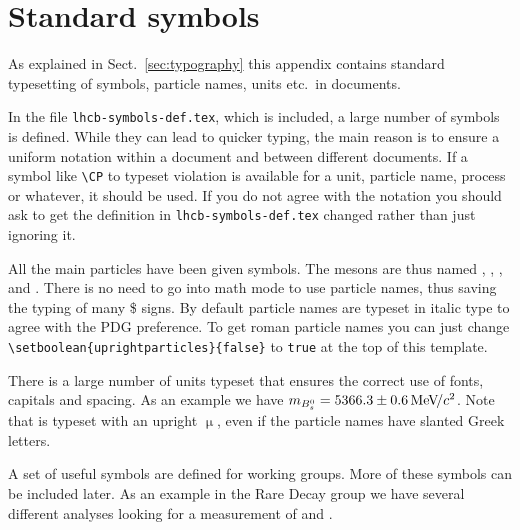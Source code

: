 \section{Standard symbols}

As explained in Sect.~\ref{sec:typography} this appendix contains standard
typesetting of symbols, particle names, units etc.\ in \lhcb
documents.

In the file \texttt{lhcb-symbols-def.tex}, which is included, a
large number of symbols is defined. While they can lead to quicker
typing, the main reason is to ensure a uniform notation within a
document and between different \lhcb documents. If a symbol
like \texttt{\textbackslash CP} to typeset \CP violation is available
for a unit, particle name, process or whatever, it should be used.  If
you do not agree with the notation you should ask to get the
definition in \texttt{lhcb-symbols-def.tex} changed rather than just
ignoring it.

All the main particles have been given symbols. The \B mesons are thus
named \Bp, \Bd, \Bs, and \Bc. There is no need to go into math mode to
use particle names, thus saving the typing of many \$ signs. By
default particle names are typeset in italic type to agree with the
PDG preference. To get roman particle
names you can just change
\texttt{\textbackslash setboolean\{uprightparticles\}\{false\}}
to \texttt{true} at the top of this template.

There is a large number of units typeset that ensures the correct use
of fonts, capitals and spacing. As an example we have
${m_{{{B}^0_{s}}}}=5366.3\pm0.6\text{\,Me\kern -0.1em V\!/}c^2$. Note that \mum is typeset with an upright
$\upmu$, even if the particle names have slanted Greek letters.

A set of useful symbols are defined for working groups. More of these
symbols can be included later. As an example in the Rare Decay group
we have several different analyses looking for a measurement of
 and .


